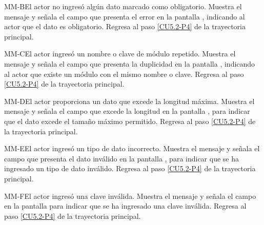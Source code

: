	\begin{UCtrayectoriaA}{MM-B}{El actor no ingresó algún dato marcado como obligatorio.}
		\UCpaso[\UCsist] Muestra el mensaje  y señala el campo que presenta el error en la pantalla , indicando al actor que el dato es obligatorio.
		\UCpaso Regresa al paso \ref{CU5.2-P4} de la trayectoria principal.
	\end{UCtrayectoriaA}
	
	\begin{UCtrayectoriaA}{MM-C}{El actor ingresó un nombre o clave de módulo repetido.}
		\UCpaso[\UCsist] Muestra el mensaje  y señala el campo que presenta la duplicidad en la pantalla , indicando al actor que existe un módulo con el mismo nombre o clave.
		\UCpaso Regresa al paso \ref{CU5.2-P4} de la trayectoria principal.
	\end{UCtrayectoriaA}

	\begin{UCtrayectoriaA}{MM-D}{El actor proporciona un dato que excede la longitud máxima.}
		\UCpaso[\UCsist] Muestra el mensaje  y señala el campo que excede la longitud en la pantalla , para indicar que el dato excede el tamaño máximo permitido.
		\UCpaso Regresa al paso \ref{CU5.2-P4} de la trayectoria principal.
	\end{UCtrayectoriaA}

	\begin{UCtrayectoriaA}{MM-E}{El actor ingresó un tipo de dato incorrecto.}
		\UCpaso[\UCsist] Muestra el mensaje  y señala el campo que presenta el dato inválido en la pantalla , para indicar que se ha ingresado un tipo de dato inválido.
		\UCpaso Regresa al paso \ref{CU5.2-P4} de la trayectoria principal.
	\end{UCtrayectoriaA}

	\begin{UCtrayectoriaA}{MM-F}{El actor ingresó una clave inválida.}
		\UCpaso[\UCsist] Muestra el mensaje  y señala el campo en la pantalla  para indicar que se ha ingresado una clave inválida.
		\UCpaso Regresa al paso \ref{CU5.2-P4} de la trayectoria principal.
	\end{UCtrayectoriaA}

